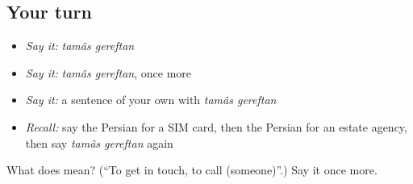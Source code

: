 \subsection*{Your turn}
\begin{itemize}
\raggedright
  \item \emph{Say it:} \emph{tamâs gereftan}
  \item \emph{Say it:} \emph{tamâs gereftan}, once more
  \item \emph{Say it:} a sentence of your own with \emph{tamâs gereftan}
  \item \emph{Recall:} say the Persian for a SIM card, then the Persian for an estate agency, then say \emph{tamâs gereftan} again
\end{itemize}

\begin{tcolorbox}[breakable,colback=teal!4,colframe=teal!35!black,title={Before you move on}]
What does   mean? (\textquotedblleft{}To get in touch, to call (someone)\textquotedblright{}.) Say it once more.
\end{tcolorbox}
